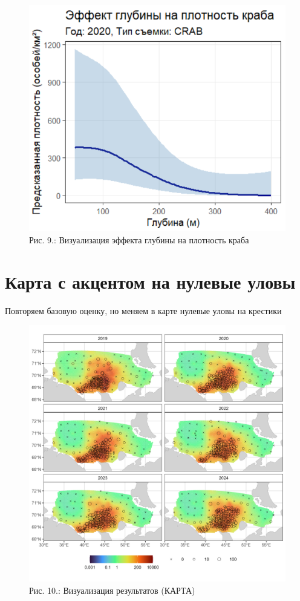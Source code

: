 \documentclass[
  letterpaper,
  DIV=11,
  numbers=noendperiod]{scrreprt}
\begin{document}
\begin{figure}[H]

{\centering \includegraphics[width=0.6\linewidth,height=\textheight,keepaspectratio]{images/sdmTMB8.PNG}

}

\caption{Рис. 9.: Визуализация эффекта глубины на плотность краба}

\end{figure}%

\section{Карта с акцентом на нулевые
уловы}\label{ux43aux430ux440ux442ux430-ux441-ux430ux43aux446ux435ux43dux442ux43eux43c-ux43dux430-ux43dux443ux43bux435ux432ux44bux435-ux443ux43bux43eux432ux44b}

Повторяем базовую оценку, но меняем в карте нулевые уловы на крестики

\begin{figure}[H]

{\centering \includegraphics[width=0.9\linewidth,height=\textheight,keepaspectratio]{images/sdmTMBmapZero.jpg}

}

\caption{Рис. 10.: Визуализация результатов (КАРТА)}

\end{figure}%
\end{document}
